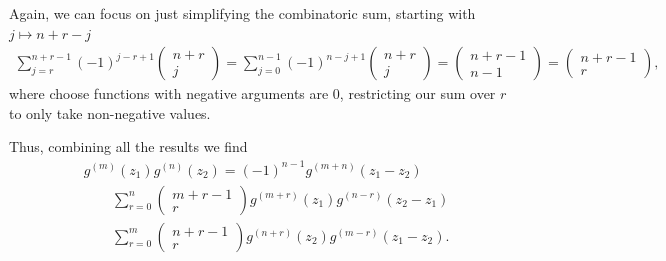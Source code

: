 Again, we can focus on just simplifying the combinatoric sum, starting with $j \mapsto n+r-j$
\begin{align}
    \sum_{j=r}^{n+r-1} (-1)^{j-r+1} \begin{pmatrix}n+r \\ j\end{pmatrix} = \sum_{j=0}^{n-1} (-1)^{n-j+1} \begin{pmatrix}n+r \\ j\end{pmatrix} = \begin{pmatrix} n+r-1 \\ n-1 \end{pmatrix} = \begin{pmatrix} n+r-1 \\ r \end{pmatrix},
\end{align}
where choose functions with negative arguments are 0, restricting our sum over $r$ to only take non-negative values.

Thus, combining all the results we find
\begin{align}
    & g^{(m)}(z_1)g^{(n)}(z_2) = (-1)^{n-1} g^{(m+n)}(z_1-z_2) \\
    & \quad \quad \sum_{r=0}^n \begin{pmatrix} m+r-1 \\ r \end{pmatrix} g^{(m+r)}(z_1) g^{(n-r)}(z_2-z_1) \\
    & \quad \quad \sum_{r=0}^m \begin{pmatrix} n+r-1 \\ r \end{pmatrix} g^{(n+r)}(z_2) g^{(m-r)}(z_1-z_2).
\end{align}